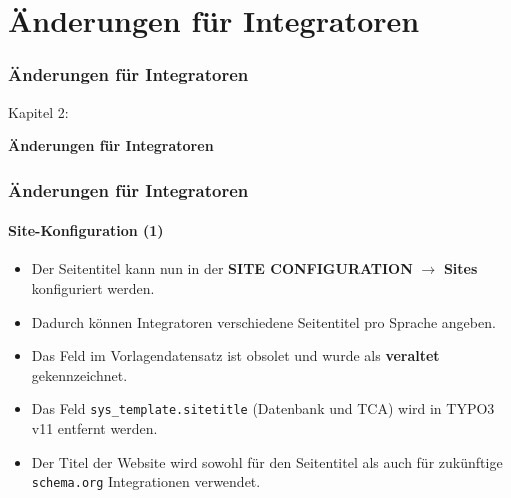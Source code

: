 %

\section{Änderungen für Integratoren}
\begin{frame}[fragile]
	\frametitle{Änderungen für Integratoren}

	\begin{center}\huge{Kapitel 2:}\end{center}
	\begin{center}\huge{\color{typo3darkgrey}\textbf{Änderungen für Integratoren}}\end{center}

\end{frame}


\begin{frame}[fragile]
	\frametitle{Änderungen für Integratoren}
	\framesubtitle{Site-Konfiguration (1)}

	\begin{itemize}

		\item Der Seitentitel kann nun in der
			\textbf{SITE CONFIGURATION} $\rightarrow$ \textbf{Sites} konfiguriert werden.
		\item Dadurch können Integratoren verschiedene Seitentitel pro Sprache angeben.
		\item Das Feld im Vorlagendatensatz ist obsolet und wurde als \textbf{veraltet} gekennzeichnet.
		\item Das Feld \texttt{sys\_template.sitetitle} (Datenbank und TCA) wird in TYPO3 v11 entfernt werden.
		\item Der Titel der Website wird sowohl für den Seitentitel als auch für 
			zukünftige \texttt{schema.org} Integrationen verwendet.
	\end{itemize}

\end{frame}


